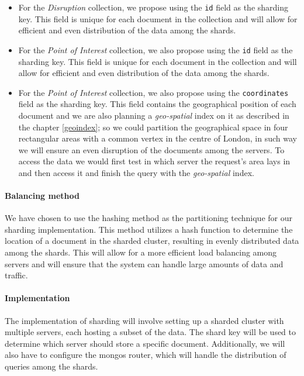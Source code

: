 \begin{itemize}
	\item For the \textit{Disruption} collection, we propose using the \texttt{id} field as the sharding key. This field is unique for each document in the collection and will allow for efficient and even distribution of the data among the shards.
	
	\item For the \textit{Point of Interest} collection, we also propose using 
	the \texttt{id} field as the sharding key. This field is unique for each 
	document in the collection and will allow for efficient and even 
	distribution of the data among the shards.
	
	\item For the \textit{Point of Interest} collection, we also propose using 
	the \texttt{coordinates} field as the sharding key. This field contains the 
	geographical position of each document and we are also planning a 
	\textit{geo-spatial} 
	index on it as described in the chapter \ref{geoindex}; so we could 
	partition the geographical space in four rectangular areas with a common 
	vertex in the centre of London, in such way we will ensure an even 
	disruption 
	of the documents among the servers. To access the data we would first test 
	in which server the request's area lays in and then access it and finish 
	the query with the \textit{geo-spatial} index.
	
\end{itemize}

\paragraph{Balancing method}
We have chosen to use the hashing method as the partitioning technique for our sharding implementation. This method utilizes a hash function to determine the location of a document in the sharded cluster, resulting in evenly distributed data among the shards. This will allow for a more efficient load balancing among servers and will ensure that the system can handle large amounts of data and traffic.

\paragraph{Implementation}
The implementation of sharding will involve setting up a sharded cluster with multiple servers, each hosting a subset of the data. The shard key will be used to determine which server should store a specific document. Additionally, we will also have to configure the mongos router, which will handle the distribution of queries among the shards.

